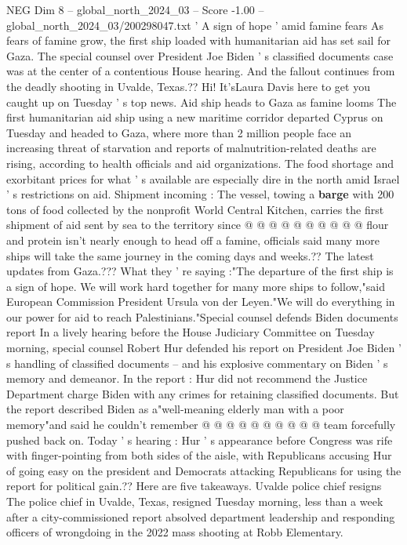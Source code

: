 \begin{textsample}{NEG Dim 8 – global\_north\_2024\_03 – Score -1.00 – global\_north\_2024\_03/200298047.txt}  \label{ex:f8_neg_221}
' A sign of hope ' amid famine fears As fears of famine grow, the first ship loaded with humanitarian aid has set sail for Gaza.
The special counsel over President Joe Biden ' s classified documents case was at the center of a contentious House hearing.
And the fallout continues from the deadly shooting in Uvalde, Texas.??
Hi!
It'sLaura Davis here to get you caught up on Tuesday ' s top news.
Aid ship heads to Gaza as famine looms The first humanitarian aid ship using a new maritime corridor departed Cyprus on Tuesday and headed to Gaza, where more than 2 million people face an increasing threat of starvation and reports of malnutrition-related deaths are rising, according to health officials and aid organizations.
The food shortage and exorbitant prices for what ' s available are especially dire in the north amid Israel ' s restrictions on aid.
Shipment incoming : The vessel, towing a \textbf{barge} with 200 tons of food collected by the nonprofit World Central Kitchen, carries the first shipment of aid sent by sea to the territory since @ @ @ @ @ @ @ @ @ @ flour and protein isn't nearly enough to head off a famine, officials said many more ships will take the same journey in the coming days and weeks.??
The latest updates from Gaza.???
What they ' re saying :"The departure of the first ship is a sign of hope.
We will work hard together for many more ships to follow,"said European Commission President Ursula von der Leyen."We will do everything in our power for aid to reach Palestinians."Special counsel defends Biden documents report In a lively hearing before the House Judiciary Committee on Tuesday morning, special counsel Robert Hur defended his report on President Joe Biden ' s handling of classified documents -- and his explosive commentary on Biden ' s memory and demeanor.
In the report : Hur did not recommend the Justice Department charge Biden with any crimes for retaining classified documents.
But the report described Biden as a"well-meaning elderly man with a poor memory"and said he couldn't remember @ @ @ @ @ @ @ @ @ @ team forcefully pushed back on.
Today ' s hearing : Hur ' s appearance before Congress was rife with finger-pointing from both sides of the aisle, with Republicans accusing Hur of going easy on the president and Democrats attacking Republicans for using the report for political gain.??
Here are five takeaways.
Uvalde police chief resigns The police chief in Uvalde, Texas, resigned Tuesday morning, less than a week after a city-commissioned report absolved department leadership and responding officers of wrongdoing in the 2022 mass shooting at Robb Elementary.

\end{textsample}
